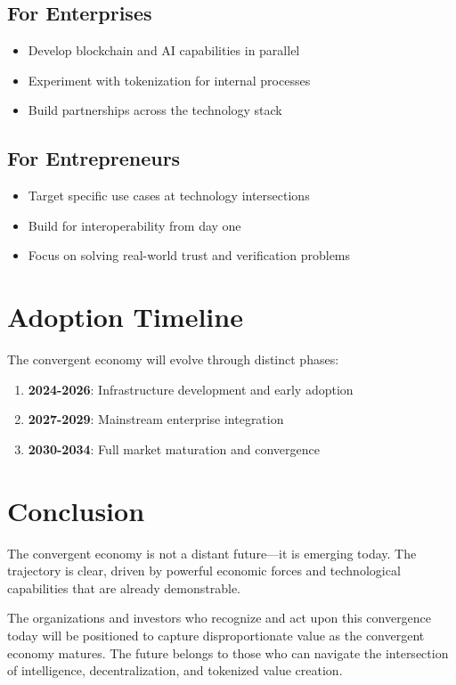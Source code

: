 \documentclass[11pt,a4paper]{report}
\begin{document}
\subsection{For Enterprises}
\begin{itemize}
\item Develop blockchain and AI capabilities in parallel
\item Experiment with tokenization for internal processes
\item Build partnerships across the technology stack
\end{itemize}

\subsection{For Entrepreneurs}
\begin{itemize}
\item Target specific use cases at technology intersections
\item Build for interoperability from day one
\item Focus on solving real-world trust and verification problems
\end{itemize}

\section{Adoption Timeline}

The convergent economy will evolve through distinct phases:

\begin{enumerate}
\item \textbf{2024-2026}: Infrastructure development and early adoption
\item \textbf{2027-2029}: Mainstream enterprise integration
\item \textbf{2030-2034}: Full market maturation and convergence
\end{enumerate}

\section{Conclusion}

The convergent economy is not a distant future---it is emerging today. The trajectory is clear, driven by powerful economic forces and technological capabilities that are already demonstrable.

The organizations and investors who recognize and act upon this convergence today will be positioned to capture disproportionate value as the convergent economy matures. The future belongs to those who can navigate the intersection of intelligence, decentralization, and tokenized value creation.
\end{document}
